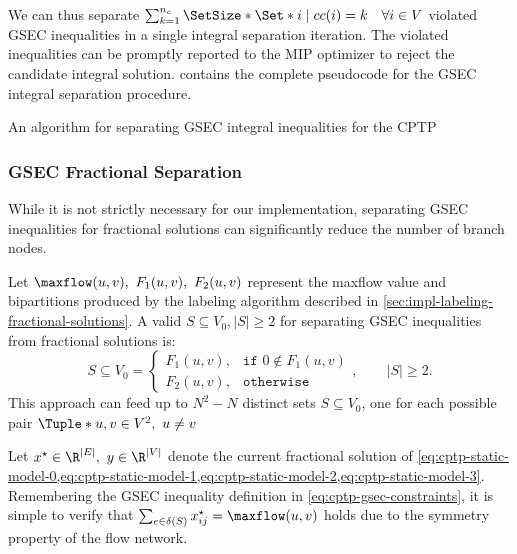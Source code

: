 \medskip

We can thus separate
$\sum^{n_c}_{k = 1} \SetSize*{ \Set*{ i \mid cc(i) = k \quad \forall i \in V } }$
violated GSEC inequalities in a single integral separation iteration.
The violated inequalities
can be promptly reported to the MIP optimizer to reject the candidate integral solution.
 contains the complete pseudocode for the GSEC integral separation procedure.

\begin{algorithm}
	\caption{An algorithm for separating GSEC integral inequalities for the CPTP}
	\label{algo:gsec-integral-sep}
	
\end{algorithm}

\subsubsection{GSEC Fractional Separation}
\label{sec:impl-gsec-fractional-separation}

While it is not strictly necessary for our implementation,
separating GSEC inequalities for fractional solutions can significantly reduce the number of branch nodes.

Let $\maxflow(u, v),\ F_1(u, v),\ F_2(u, v)$ represent the maxflow value and bipartitions
produced by the labeling algorithm described in \cref{sec:impl-labeling-fractional-solutions}.
A valid $S \subseteq V_0, |S| \ge 2$ for separating GSEC inequalities from fractional solutions is:
\begin{equation}
	S \subseteq V_0 =
	\begin{cases}
		F_1(u, v), & \texttt{if } 0 \notin F_1(u, v) \\
		F_2(u, v), & \texttt{otherwise}
	\end{cases},
	\qquad
	|S| \ge 2.
\end{equation}
This approach can feed up to
$N^2 - N$ distinct sets $S \subseteq V_0$,
one for each possible pair $\Tuple*{u, v} \in V^2,\ u \ne v$

Let $x^\star \in \R^{|E|},\ y \in \R^{|V|}$ denote the
current fractional solution of
\cref{eq:cptp-static-model-0,eq:cptp-static-model-1,eq:cptp-static-model-2,eq:cptp-static-model-3}.
Remembering the GSEC inequality definition in \cref{eq:cptp-gsec-constraints},
it is simple to verify that $\sum_{e \in \delta(S)} x^\star_{ij} = \maxflow(u, v)$
holds due to the symmetry property of the flow network.

